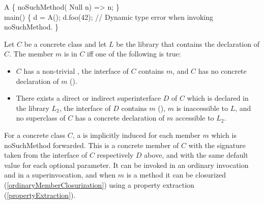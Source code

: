 \documentclass[makeidx]{article}
\begin{document}
\begin{dartCode}
\CLASS{} A \{
  noSuchMethod(\COVARIANT{} Null n) => n;
\}
\\
\VOID{} main() \{
  \DYNAMIC{} d = A();
  d.foo(42); // Dynamic type error when invoking noSuchMethod.
\}
\end{dartCode}

\LMHash{}%
Let $C$ be a concrete class and
let $L$ be the library that contains the declaration of $C$.
The member $m$ is  in $C$ if{}f
one of the following is true:

\begin{itemize}
\item $C$ has a non-trivial ,
  the interface of $C$ contains $m$,
  and $C$ has no concrete declaration of $m$
  ().
\item
  There exists a direct or indirect superinterface
  $D$ of $C$ which is declared in the library $L_2$,
  the interface of $D$ contains $m$
  (),
  $m$ is inaccessible to $L$,
  and no superclass of $C$ has
  a concrete declaration of $m$ accessible to $L_2$.
\end{itemize}

\LMHash{}%
For a concrete class $C$, a
is implicitly induced for each member $m$
which is noSuchMethod forwarded.
This is a concrete member of $C$
with the signature taken from the interface of $C$ respectively $D$ above,
and with the same default value for each optional parameter.
It can be invoked in an ordinary invocation and in a superinvocation,
and when $m$ is a method it can be closurized
(\ref{ordinaryMemberClosurization})
using a property extraction
(\ref{propertyExtraction}).


\end{document}
